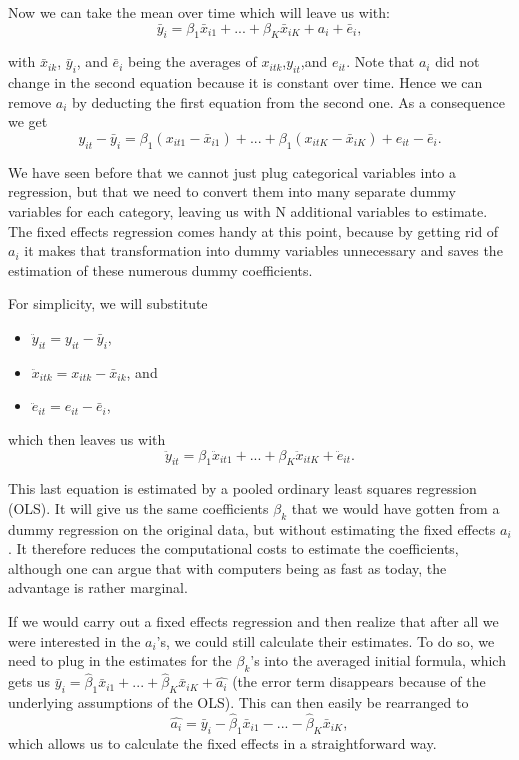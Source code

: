\documentclass[a4paper,11pt,abstract=on]{scrartcl}
\begin{document}
{{Now we can take the mean over time which will leave us with:
\[\bar{y}_i = \beta_1 \bar{x}_{i1} + ... + \beta_K \bar{x}_{iK} + a_i + \bar{e}_i,\]

with $\bar{x}_{ik}$, $\bar{y}_i$, and $\bar{e}_i$ being the averages of
$x_{itk}$,$y_{it}$,and $e_{it}$. Note that $a_i$ did not change in the
second equation because it is constant over time. Hence we can remove
$a_i$ by deducting the first equation from the second one. As a
consequence we get
\[y_{it} - \bar{y}_i = \beta_1(x_{it1}-\bar{x}_{i1}) + ... + \beta_1(x_{itK}-\bar{x}_{iK})  + e_{it}- \bar{e}_i.\]

We have seen before that we cannot just plug categorical variables into
a regression, but that we need to convert them into many separate dummy
variables for each category, leaving us with N additional variables to
estimate. The fixed effects regression comes handy at this point,
because by getting rid of $a_i$ it makes that transformation into dummy
variables unnecessary and saves the estimation of these numerous dummy
coefficients.

For simplicity, we will substitute

\begin{itemize}
\itemsep1pt\parskip0pt
\item
  $\ddot{y}_{it} = y_{it} - \bar{y}_i$,
\item
  $\ddot{x}_{itk} = x_{itk} - \bar{x}_{ik}$, and
\item
  $\ddot{e}_{it} = e_{it} - \bar{e}_i$,
\end{itemize}

which then leaves us with
\[\ddot{y}_{it} = \beta_1\ddot{x}_{it1}+...+ \beta_K\ddot{x}_{itK} +\ddot{e}_{it}.\]

This last equation is estimated by a pooled ordinary least squares
regression (OLS). It will give us the same coefficients $\beta_k$ that
we would have gotten from a dummy regression on the original data, but
without estimating the fixed effects $a_i$. It therefore reduces the
computational costs to estimate the coefficients, although one can argue
that with computers being as fast as today, the advantage is rather
marginal. 

If we would carry out a fixed effects regression and then realize that
after all we were interested in the $a_i$'s, we could still calculate
their estimates. To do so, we need to plug in the estimates for the
$\beta_k$'s into the averaged initial formula, which gets us
$\bar{y}_i = \hat{\beta}_1 \bar{x}_{i1} + ... + \hat{\beta}_K \bar{x}_{iK} + \hat{a_i}$
(the error term disappears because of the underlying assumptions of the
OLS). This can then easily be rearranged to
\[\hat{a_i} =  \bar{y}_i - \hat{\beta}_1 \bar{x}_{i1} - ... - \hat{\beta}_K \bar{x}_{iK},\]
which allows us to calculate the fixed effects in a straightforward way.

}}
\end{document}
